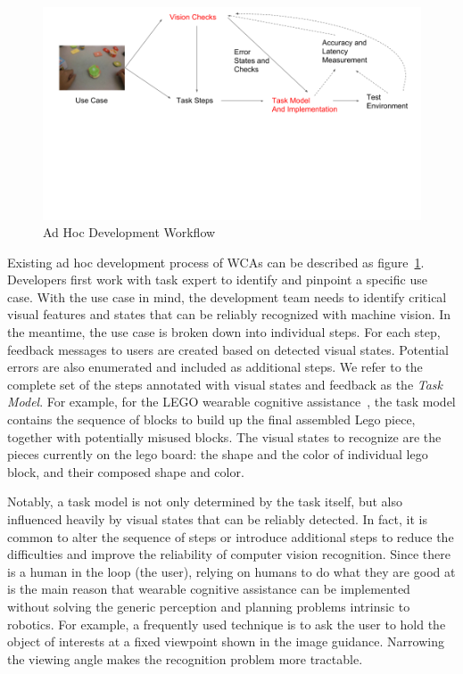 \begin{figure}
  \centering
  \includegraphics[trim={0 6cm 0 0},width=\linewidth]{FIGS/ad-hoc-workflow}
	\caption{Ad Hoc Development Workflow}
    \label{figs:workflow}
\end{figure}

Existing ad hoc development process of WCAs can be described as
figure~\ref{figs:workflow}. Developers first work with task expert to identify
and pinpoint a specific use case. With the use case in mind, the development
team needs to identify critical visual features and states that can be reliably
recognized with machine vision. In the meantime, the use case is broken down
into individual steps. For each step, feedback messages to users are created
based on detected visual states. Potential errors are also enumerated and
included as additional steps. We refer to the complete set of the steps
annotated with visual states and feedback as the \textit{Task Model}. For
example, for the LEGO wearable cognitive assistance~\cite{chen2017empirical},
the task model contains the sequence of blocks to build up the final assembled
Lego piece, together with potentially misused blocks. The visual states to
recognize are the pieces currently on the lego board: the shape and the color of
individual lego block, and their composed shape and color.

Notably, a task model is not only determined by the task itself, but also
influenced heavily by visual states that can be reliably detected. In fact, it
is common to alter the sequence of steps or introduce additional steps to reduce
the difficulties and improve the reliability of computer vision recognition.
Since there is a human in the loop (the user), relying on humans to do what they
are good at is the main reason that wearable cognitive assistance can be
implemented without solving the generic perception and planning problems
intrinsic to robotics. For example, a frequently used technique is to ask the
user to hold the object of interests at a fixed viewpoint shown in the image
guidance. Narrowing the viewing angle makes the recognition problem more
tractable.

